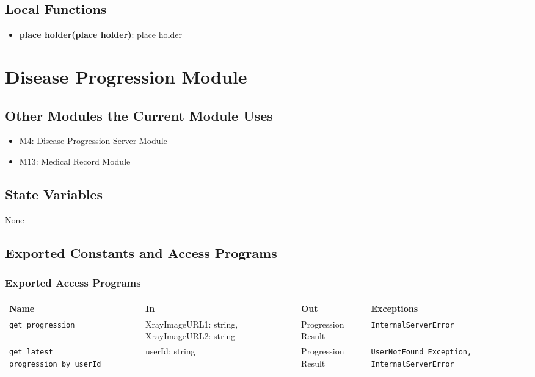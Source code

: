 \documentclass[12pt, titlepage]{article}
\begin{document}
\subsection{Local Functions}
\begin{itemize}
\item \textbf{place holder(place holder)}: place holder
\end{itemize}

\section{Disease Progression Module}
\label{Disease Progression Module}

\subsection{Other Modules the Current Module Uses}
\begin{itemize}
    \item M4: Disease Progression Server Module
    \item M13: Medical Record Module
\end{itemize}

\subsection{State Variables}
\begin{description}
    \item None
\end{description}

\subsection{Exported Constants and Access Programs}
\subsubsection{Exported Access Programs}
\begin{center}
  \begin{tabular}{|p{4.5cm}|p{3cm}|p{2.5cm}|p{4cm}|}
    \hline
    \textbf{Name} & \textbf{In} & \textbf{Out} & \textbf{Exceptions} \\
    \hline
    \texttt{get\_progression} & XrayImageURL1: string, \newline XrayImageURL2: string & Progression Result & \texttt{InternalServerError} \\
    \hline
    \texttt{get\_latest\_ progression\_by\_userId} & userId: string & Progression Result & \texttt{UserNotFound Exception, InternalServerError} \\
    \hline
  \end{tabular}
\end{center}
\end{document}
